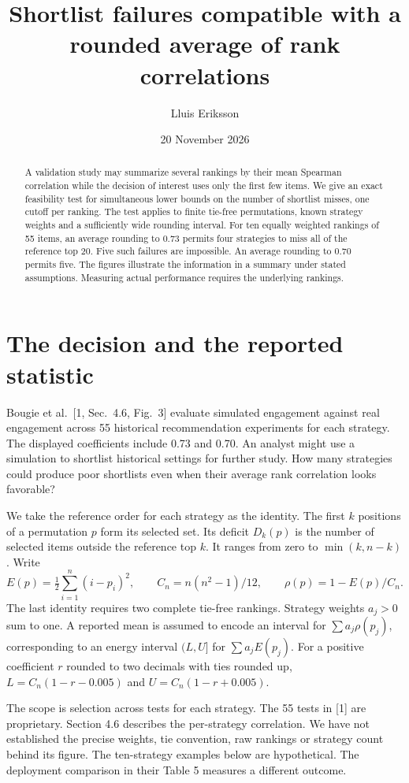 \documentclass[11pt]{article}
\title{Shortlist failures compatible with a rounded average of rank correlations}
\author{Lluis Eriksson}\date{20 November 2026}
\begin{document}
\maketitle
\begin{abstract}
A validation study may summarize several rankings by their mean Spearman correlation while the decision of interest uses only the first few items. We give an exact feasibility test for simultaneous lower bounds on the number of shortlist misses, one cutoff per ranking. The test applies to finite tie-free permutations, known strategy weights and a sufficiently wide rounding interval. For ten equally weighted rankings of 55 items, an average rounding to 0.73 permits four strategies to miss all of the reference top 20. Five such failures are impossible. An average rounding to 0.70 permits five. The figures illustrate the information in a summary under stated assumptions. Measuring actual performance requires the underlying rankings.
\end{abstract}
\section{The decision and the reported statistic}
Bougie et al.\ [1, Sec.~4.6, Fig.~3] evaluate simulated engagement against real engagement across 55 historical recommendation experiments for each strategy. The displayed coefficients include 0.73 and 0.70. An analyst might use a simulation to shortlist historical settings for further study. How many strategies could produce poor shortlists even when their average rank correlation looks favorable?

We take the reference order for each strategy as the identity. The first $k$ positions of a permutation $p$ form its selected set. Its deficit $D_k(p)$ is the number of selected items outside the reference top $k$. It ranges from zero to $\min(k,n-k)$. Write
\[
 E(p)=\tfrac12\sum_{i=1}^n(i-p_i)^2,\qquad C_n=n(n^2-1)/12,\qquad
 \rho(p)=1-E(p)/C_n .
\]
The last identity requires two complete tie-free rankings. Strategy weights $a_j>0$ sum to one. A reported mean is assumed to encode an interval for $\sum a_j\rho(p_j)$, corresponding to an energy interval $(L,U]$ for $\sum a_jE(p_j)$. For a positive coefficient $r$ rounded to two decimals with ties rounded up, $L=C_n(1-r-0.005)$ and $U=C_n(1-r+0.005)$.

The scope is selection across tests for each strategy. The 55 tests in [1] are proprietary. Section 4.6 describes the per-strategy correlation. We have not established the precise weights, tie convention, raw rankings or strategy count behind its figure. The ten-strategy examples below are hypothetical. The deployment comparison in their Table 5 measures a different outcome.
\newpage
\end{document}
